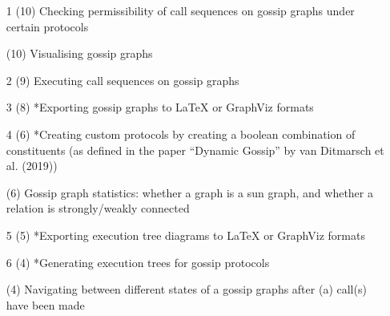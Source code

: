 \begin{enumerate}
    \item[1] (10)  Checking permissibility of call sequences on gossip graphs under certain protocols	
    \item[] (10)  Visualising gossip graphs	
    \item[2] (9) Executing call sequences on gossip graphs	
    \item[3] (8) *Exporting gossip graphs to LaTeX or GraphViz formats	
    \item[4] (6) *Creating custom protocols by creating a boolean combination of constituents (as defined in the paper ``Dynamic Gossip'' by van Ditmarsch et al. (2019))	
    \item[] (6) Gossip graph statistics: whether a graph is a sun graph, and whether a relation is strongly/weakly connected	
    \item[5] (5) *Exporting execution tree diagrams to LaTeX or GraphViz formats	
    \item[6] (4) *Generating execution trees for gossip protocols	
    \item[] (4) Navigating between different states of a gossip graphs after (a) call(s) have been made
\end{enumerate}